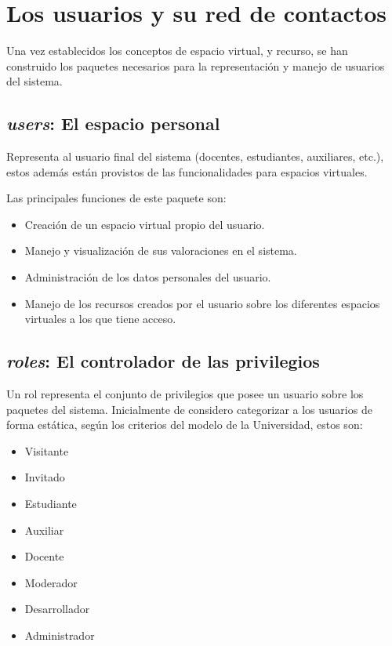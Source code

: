 \section{Los usuarios y su red de contactos}
Una vez establecidos los conceptos de espacio virtual, y recurso, se han
construido los paquetes necesarios para la representación y manejo de usuarios
del sistema.

\subsection{\emph{users}: El espacio personal}
Representa al usuario final del sistema (docentes, estudiantes, auxiliares,
etc.), estos además están provistos de las funcionalidades para espacios
virtuales.

Las principales funciones de este paquete son:

\begin{itemize}
\item Creación de un espacio virtual propio del usuario.
\item Manejo y visualización de sus valoraciones en el sistema.
\item Administración de los datos personales del usuario.
\item Manejo de los recursos creados por el usuario sobre los diferentes
espacios virtuales a los que tiene acceso.
\end{itemize}

\subsection{\emph{roles}: El controlador de las privilegios}
Un rol representa el conjunto de privilegios que posee un usuario sobre los
paquetes del sistema.
Inicialmente de considero categorizar a los usuarios de forma estática, según
los criterios del modelo de la Universidad, estos son:

\begin{itemize}
\item Visitante
\item Invitado
\item Estudiante
\item Auxiliar
\item Docente
\item Moderador
\item Desarrollador
\item Administrador
\end{itemize}

